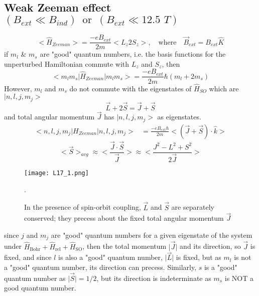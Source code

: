 \documentclass[12pt,fancychapters]{report}
\numberwithin{equation}{section}
\begin{document}
\subsection{Weak Zeeman effect $(B_{ext}\ll B_{ind})\,\,\,\text{or}\,\,\,(B_{ext}\ll 12.5\,\,T)$}
\[
  \big<\hat{H}_{Zeeman}\big> = \frac{-eB_{ext}}{2m}\big<L_z 2S_z \big>,\quad \text{where}\quad
  \vec{B}_{ext} = B_{ext}\hat{K}
\]
if $m_l$ \& $m_s$ are "good" quantum numbers, i.e. the basis functions for the unperturbed 
Hamiltonian commute with $L_z$ and $S_z$, then
\[
  \big<m_l m_s\big|\hat{H}_{Zeeman}\big|m_lm_s\big> = \frac{-eB_{ext}}{2m} \hbar\left(
  m_l + 2m_s\right)
\]
However, $m_l$ and $m_s$ do not commute with the eigenstates of $\hat{H}_{SO}$ which are 
$\big|n, l, j, m_j\big>$
\[
  \vec{L}+2\vec{S} = \vec{J}+\vec{S}
\]
and total angular momentum $\vec{J}$ has $\big|n, l, j, m_j\big>$ as eigenstates.
\begin{align*}
  \big<n,l, j, m_j\big|H_{Zeeman}\big|n,l,j,m_j\big> &= \frac{-eB_{ext}\hbar}{2m}
  \big<(\vec{J}+\vec{S})\cdot\hat{k} \big>
\end{align*}
\[
  \big<\vec{S}\big>_{avg} \approx \bigg<\frac{\vec{J}\cdot\vec{S}}{\vec{J}} \bigg>
  \approx \bigg<\frac{J^2 - L^2 + S^2}{2\vec{J}}\bigg>
\]
\begin{figure}[H]
  \centering
  \texttt{[image: L17\_1.png]}
  \caption{In the presence of spin-orbit coupling, $\vec{L}$ and $\vec{S}$ are separately 
  conserved; they precess about the fixed total angular momentum $\vec{J}$}.
\end{figure}
since $j$ and $m_j$ are "good" quantum numbers for a given eigenstate of 
the system under $\hat{H}_\text{Bohr} + \hat{H}_\text{rel} + \hat{H}_\text{SO}$, then the total 
momentum $\big|\vec{J}\big|$ and its direction, so $\vec{J}$ is fixed, and since $l$ is also 
a "good" quantum number, $\big|\vec{L}\big|$ is fixed, but as $m_l$ is not a "good" quantum number,
its direction can precess. Similarly, $s$ is a "good" quantum number as $\big|\vec{S}\big| = 1/2$,
but its direction is indeterminate as $m_s$ is NOT a good quantum number.\\
\end{document}

